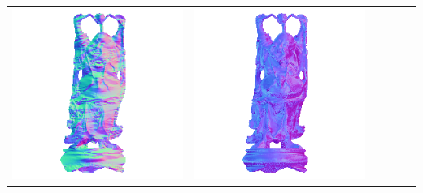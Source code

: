 \begin{center}
\begin{tabularx}{\linewidth}{@{}Y@{}Y@{}Y@{}Y@{}Y@{}Y@{}}
\includegraphics[width=\linewidth]{semisynthetic/20150514_20_yu_out.png} &
\includegraphics[width=\linewidth]{semisynthetic/20150514_20_dpsn_out.png} &

\end{tabularx}
\end{center}
